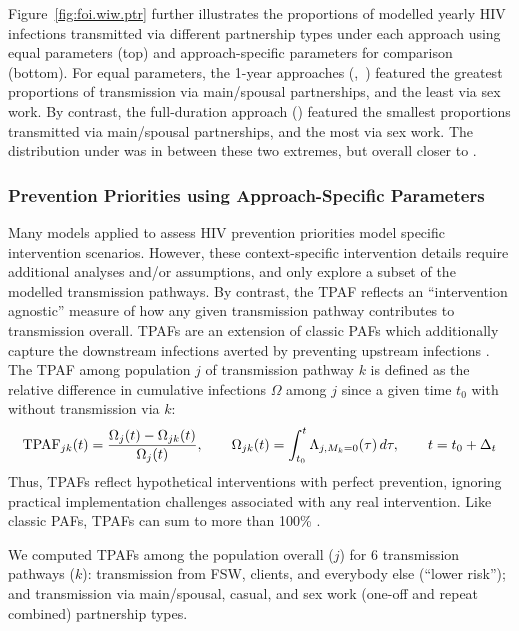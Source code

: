 \par
Figure~\ref{fig:foi.wiw.ptr} further illustrates the proportions of modelled yearly HIV infections
transmitted via different partnership types under each approach
using equal parameters (top) and approach-specific parameters for comparison (bottom).
For equal parameters, the 1-year approaches (\iry,~\ipy) featured
the greatest proportions of transmission via main/spousal partnerships, and the least via sex work.
By contrast, the full-duration approach (\ird) featured
the smallest proportions transmitted via main/spousal partnerships, and the most via sex work.
The distribution under \epa was in between these two extremes,
but overall closer to \ird.
\subsubsection{Prevention Priorities using Approach-Specific Parameters}\label{foi.exp.mod.tpaf}
Many models applied to assess HIV prevention priorities model specific intervention scenarios.
However, these context-specific intervention details
require additional analyses and/or assumptions,
and only explore a subset of the modelled transmission pathways.
By contrast, the TPAF reflects an ``intervention agnostic'' measure of
how any given transmission pathway contributes to transmission overall.
TPAFs are an extension of classic PAFs which additionally capture
the downstream infections averted by preventing upstream infections \cite{Mishra2014tpaf}.
The TPAF among population $j$ of transmission pathway $k$ is defined as
the relative difference in cumulative infections $\Omega$ among $j$ since a given time $t_0$
with \vs without transmission via $k$:
\begin{equation}\label{eq:tpaf}
  \textup{TPAF}_{jk}(t) = \frac{\Omega_{j}(t) - \Omega_{jk} (t)}{\Omega_{j}(t)}
  ,\qquad
  \Omega_{jk}(t) = \int_{t_0}^{t} \Lambda_{j,M_k=0}(\tau)\,d\tau
  ,\qquad
  t = t_0 + \Delta_t
\end{equation}
Thus, TPAFs reflect hypothetical interventions with perfect prevention,
ignoring practical implementation challenges associated with any real intervention.
Like classic PAFs, TPAFs can sum to more than 100\% \cite{Rowe2004,Mishra2021}.
\par
We computed TPAFs among the population overall ($j$)
for 6 transmission pathways ($k$):
transmission from FSW, clients, and everybody else (``lower risk''); and
transmission via main/spousal, casual, and sex work (one-off and repeat combined) partnership types.
